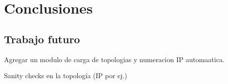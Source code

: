 \chapter{Conclusiones}

\section{Trabajo futuro}
Agregar un modulo de carga de topologias y numeracion IP automaatica.

Sanity checks en la topología (IP por ej.)